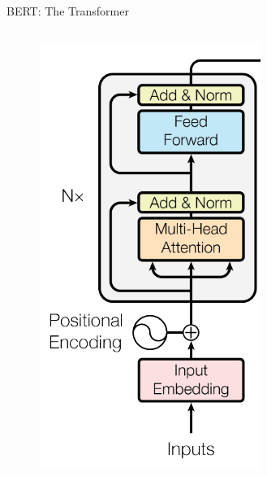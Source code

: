 \documentclass[12pt,aspectratio=169,handout]{beamer}
\begin{document}
\begin{frame}{BERT: The Transformer}
\begin{columns}
\begin{column}{0.3\linewidth}
\begin{figure}
				\includegraphics[width=\linewidth]{img/transformer.png}
			\end{figure}
		\end{column}
	\end{columns}
	
\end{frame}
\end{document}
